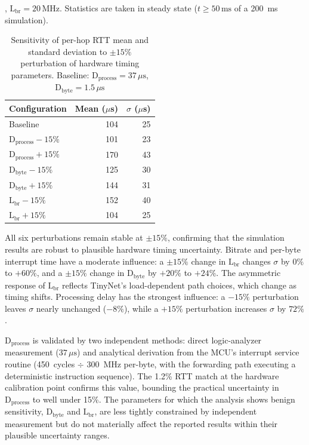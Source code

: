 \begin{table}[h]
	\centering
	\caption{Sensitivity of per-hop RTT mean and standard deviation to $\pm15\%$ perturbation of hardware timing parameters. Baseline: $\mathrm{D}_{\mathrm{process}} = 37\,\mu\mathrm{s}$, $\mathrm{D}_{\mathrm{byte}} = 1.5\,\mu\mathrm{s}$}, $\mathrm{L}_{\mathrm{br}} = 20\,\mathrm{MHz}$. Statistics are taken in steady state ($t \geq 50\,\mathrm{ms}$ of a 200~ms simulation).
	\label{tab:sensitivity}
	\begin{tabular}{||l|r|r||}
		\hline
		Configuration & Mean ($\mu$s) & $\sigma$ ($\mu$s) \\\hline\hline
		Baseline & 104 & 25 \\
		$\mathrm{D}_{\mathrm{process}} -15\%$ & 101 & 23 \\
		$\mathrm{D}_{\mathrm{process}} +15\%$ & 170 & 43 \\
		$\mathrm{D}_{\mathrm{byte}} -15\%$ & 125 & 30 \\
		$\mathrm{D}_{\mathrm{byte}} +15\%$ & 144 & 31 \\
		$\mathrm{L}_{\mathrm{br}} -15\%$ & 152 & 40 \\
		$\mathrm{L}_{\mathrm{br}} +15\%$ & 104 & 25 \\
		\hline
	\end{tabular}
\end{table}

All six perturbations remain stable at $\pm15\%$, confirming that the simulation results are robust to plausible hardware timing uncertainty. Bitrate and per-byte interrupt time have a moderate influence: a $\pm15\%$ change in $\mathrm{L}_{\mathrm{br}}$ changes $\sigma$ by $0\%$ to $+60\%$, and a $\pm15\%$ change in $\mathrm{D}_{\mathrm{byte}}$ by $+20\%$ to $+24\%$. The asymmetric response of $\mathrm{L}_{\mathrm{br}}$ reflects TinyNet's load-dependent path choices, which change as timing shifts. Processing delay has the strongest influence: a $-15\%$ perturbation leaves $\sigma$ nearly unchanged ($-8\%$), while a $+15\%$ perturbation increases $\sigma$ by $72\%$.

$\mathrm{D}_{\mathrm{process}}$ is validated by two independent methods: direct logic-analyzer measurement ($37\,\mu\mathrm{s}$) and analytical derivation from the MCU's interrupt service routine (450~cycles $\div$ 300~MHz per-byte, with the forwarding path executing a deterministic instruction sequence). The 1.2\% RTT match at the hardware calibration point confirms this value, bounding the practical uncertainty in $\mathrm{D}_{\mathrm{process}}$ to well under 15\%. The parameters for which the analysis shows benign sensitivity, $\mathrm{D}_{\mathrm{byte}}$ and $\mathrm{L}_{\mathrm{br}}$, are less tightly constrained by independent measurement but do not materially affect the reported results within their plausible uncertainty ranges.

